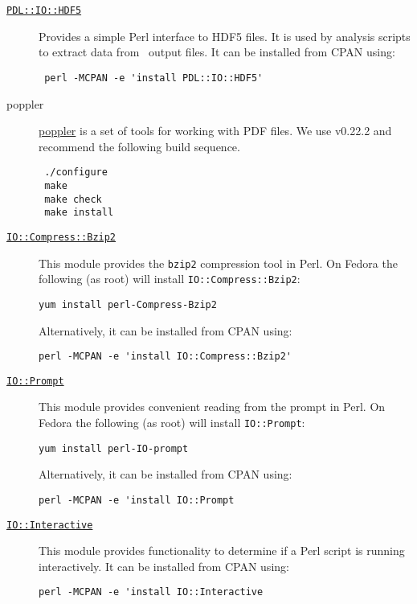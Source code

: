 \begin{description}
\item [\href{http://search.cpan.org/~chm/PDL-IO-HDF5-0.6501/hdf5.pd}{{\tt PDL::IO::HDF5}}] Provides a simple Perl interface to HDF5 files. It is used by analysis scripts to extract data from \glc\ output files. It can be installed from CPAN using:
\begin{verbatim}
 perl -MCPAN -e 'install PDL::IO::HDF5'
\end{verbatim}

\item [poppler] \href{http://poppler.freedesktop.org/}{poppler} is a set of tools for working with PDF files. We use v0.22.2 and recommend the following build sequence. 
\begin{verbatim}
 ./configure
 make
 make check
 make install
\end{verbatim}

  \item [\href{http://perldoc.perl.org/IO/Compress/Bzip2.html}{{\tt IO::Compress::Bzip2}}] This module provides the {\tt bzip2} compression tool in Perl. On Fedora the following (as root) will install {\tt IO::Compress::Bzip2}:
\begin{verbatim}
yum install perl-Compress-Bzip2
\end{verbatim}
Alternatively, it can be installed from CPAN using:
\begin{verbatim}
perl -MCPAN -e 'install IO::Compress::Bzip2'
\end{verbatim}

  \item [\href{http://search.cpan.org/~dconway/IO-Prompt-0.997002/lib/IO/Prompt.pm}{{\tt IO::Prompt}}] This module provides convenient reading from the prompt in Perl. On Fedora the following (as root) will install {\tt IO::Prompt}:
\begin{verbatim}
yum install perl-IO-prompt
\end{verbatim}
Alternatively, it can be installed from CPAN using:
\begin{verbatim}
perl -MCPAN -e 'install IO::Prompt
\end{verbatim}

  \item [\href{http://search.cpan.org/~bdfoy/IO-Interactive-0.0.6/lib/IO/Interactive.pm}{{\tt IO::Interactive}}] This module provides functionality to determine if a Perl script is running interactively. It can be installed from CPAN using:
\begin{verbatim}
perl -MCPAN -e 'install IO::Interactive
\end{verbatim}


\end{description}
